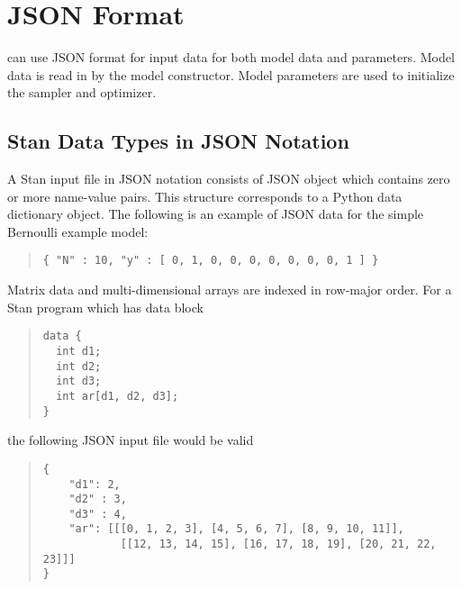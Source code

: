 \chapter{JSON Format}\label{json.chapter}

\noindent 
\CmdStan can use JSON format for input data for both
model data and parameters. Model data is read in by the model
constructor. Model parameters are used to initialize the sampler and
optimizer.

\section{Stan Data Types in JSON Notation}

A Stan input file in  JSON notation consists of  JSON object which contains zero
or more name-value pairs.  This structure corresponds to a Python data
dictionary object.  The following is an example of JSON data for the
simple Bernoulli example model:

%
\begin{quote}
\begin{Verbatim}
{ "N" : 10, "y" : [ 0, 1, 0, 0, 0, 0, 0, 0, 0, 1 ] }
\end{Verbatim}
\end{quote}
%

Matrix data and multi-dimensional arrays are indexed in row-major
order.  For a Stan program which has data block
\begin{quote}
\begin{Verbatim}
data {
  int d1;
  int d2;
  int d3;
  int ar[d1, d2, d3];
}
\end{Verbatim}
\end{quote}
\noindent
the following JSON input file would be valid
\begin{quote}
\begin{Verbatim}
{
    "d1": 2,
    "d2" : 3,
    "d3" : 4,
    "ar": [[[0, 1, 2, 3], [4, 5, 6, 7], [8, 9, 10, 11]], 
            [[12, 13, 14, 15], [16, 17, 18, 19], [20, 21, 22, 23]]]
}
\end{Verbatim}
\end{quote}

